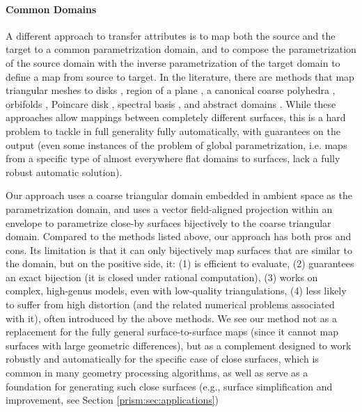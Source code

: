 \paragraph{Common Domains}

A different approach to transfer attributes is to map both the source and the target to a common parametrization domain, and to compose the parametrization of the source domain with the inverse parametrization of the target domain to define a map from source to target. In the literature, there are methods that map triangular meshes to disks \cite{Tutte:1963,Floater:97}, region of a plane 
\cite{maron2017convolutional,Aigerman:2015b,Aigerman:2014,Schuller:2013,Smith:2015,rabinovich2017scalable,jiang2017simplicial,Weber:2014:LIP,Campen:2016,Muller:2015,Gotsman:2001,surazhsky2001morphing,Zhang:2005,Fu:2016,litke2005image,schmidt2019distortion}, a canonical coarse polyhedra \cite{kraevoy2004cross,praun2001consistent}, orbifolds \cite{Aigerman:2015,Aigerman:2017,Aigerman:2016}, Poincare disk \cite{Springborn:2008,stephenson2005introduction,Kharevych:2006,Jin:2008}, spectral basis \cite{Ovsjanikov:2012,Shoham:2019,Ovsjanikov:2017}, and abstract domains \cite{kraevoy2004cross,Schreiner:2004,Pietroni:2010}.
While these approaches allow mappings between completely different surfaces, this is a hard problem to tackle in full generality fully automatically, with guarantees on the output (even some instances of the problem of global parametrization, i.e. maps from a specific type of almost everywhere flat domains to surfaces, lack a fully robust automatic solution).

%
Our approach uses a coarse triangular domain embedded in ambient space as the parametrization domain, and uses a vector field-aligned projection within an envelope to parametrize close-by surfaces bijectively to the coarse triangular domain. Compared to the methods listed above, our approach has both pros and cons. Its limitation is that it can only bijectively map surfaces that are similar to the domain, but on the positive side, it: (1) is efficient to evaluate, (2)  guarantees an exact bijection (it is closed under rational computation), (3)  works on complex, high-genus models, even with low-quality triangulations, (4) less likely to suffer from high distortion (and the related numerical problems associated with it), often introduced by the above methods.
 We see our method not as a replacement for the fully general surface-to-surface maps (since it cannot map surfaces with large geometric differences), but as a complement designed to work robustly and automatically for the specific case of close surfaces, which is common in many geometry processing algorithms, as well as serve as a foundation for generating such close surfaces (e.g., surface simplification and improvement, see Section \ref{prism:sec:applications})

